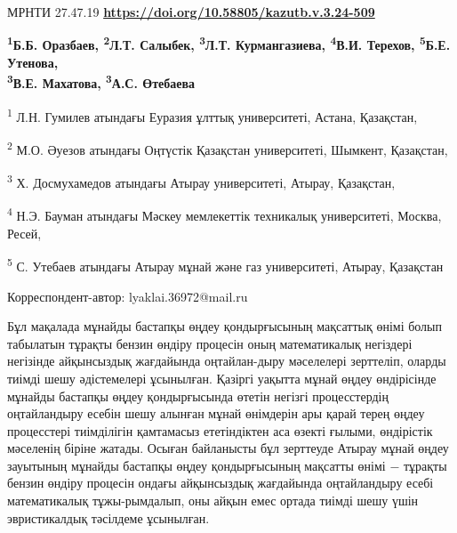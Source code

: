 \newpage
МРНТИ 27.47.19
\hfill {\bfseries \href{https://doi.org/10.58805/kazutb.v.3.24-509}{https://doi.org/10.58805/kazutb.v.3.24-509}}


\begin{center}
{\bfseries \textsuperscript{1}Б.Б. Оразбаев, \textsuperscript{2}Л.Т.
Салыбек\envelope, \textsuperscript{3}Л.Т. Курмангазиева,
\textsuperscript{4}В.И. Терехов, \textsuperscript{5}Б.Е. Утенова, 
\\\textsuperscript{3}В.Е. Махатова, \textsuperscript{3}А.С.
Өтебаева}

\textsuperscript{1} Л.Н. Гумилев атындағы Еуразия ұлттық университеті,
Астана, Қазақстан,

\textsuperscript{2} М.О. Әуезов атындағы Оңтүстік Қазақстан
университеті, Шымкент, Қазақстан,

\textsuperscript{3} Х. Досмухамедов атындағы Атырау университеті,
Атырау, Қазақстан,

\textsuperscript{4} Н.Э. Бауман атындағы Мәскеу мемлекеттік техникалық
университеті, Москва, Ресей,

\textsuperscript{5} С. Утебаев атындағы Атырау мұнай
және газ университеті, Атырау, Қазақстан
\end{center}
\envelope Корреспондент-автор: lyaklai.36972@mail.ru \vspace{0.5cm}

Бұл мақалада мұнайды бастапқы өңдеу қондырғысының мақсаттық өнімі болып
табылатын тұрақты бензин өндіру процесін оның математикалық негіздері
негізінде айқынсыздық жағдайында оңтайлан-дыру мәселелері зерттеліп,
оларды тиімді шешу әдістемелері ұсынылған. Қазіргі уақытта мұнай өңдеу
өндірісінде мұнайды бастапқы өңдеу қондырғысында өтетін негізгі
процесстердің оңтайландыру есебін шешу алынған мұнай өнімдерін ары
қарай терең өңдеу процесстері тиімділігін қамтамасыз ететіндіктен аса
өзекті ғылыми, өндірістік мәселенің біріне жатады. Осыған байланысты бұл
зерттеуде Атырау мұнай өңдеу зауытының мұнайды бастапқы өңдеу
қондырғысының мақсатты өнімі − тұрақты бензин өндіру процесін ондағы
айқынсыздық жағдайында оңтайландыру есебі математикалық тұжы-рымдалып,
оны айқын емес ортада тиімді шешу үшін эвристикалдық тәсілдеме
ұсынылған.

